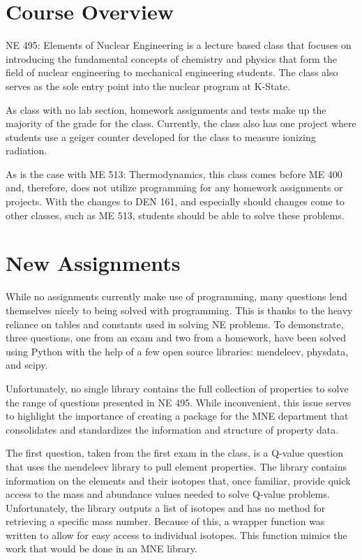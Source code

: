 \section{Course Overview}

NE 495: Elements of Nuclear Engineering is a lecture based class that focuses on introducing
the fundamental concepts of chemistry and physics that form the field of nuclear engineering 
to mechanical engineering students. The class also serves as the sole entry point into the nuclear
program at K-State. 

As class with no lab section, homework assignments and tests make up the majority of the grade
for the class. Currently, the class also has one project where students use a geiger counter 
developed for the class to measure ionizing radiation. 

As is the case with ME 513: Thermodynamics, this class comes before ME 400 and, therefore, does
not utilize programming for any homework assignments or projects. With the changes to DEN 161,
and especially should changes come to other classes, such as ME 513, students should be able 
to solve these problems.

\section{New Assignments}

While no assignments currently make use of programming, many questions lend themselves nicely
to being solved with programming. This is thanks to the heavy reliance on tables and
constants used in solving NE problems. To demonstrate, three questions, one from an exam
and two from a homework, have been solved using Python with the help of a few open source
libraries: mendeleev, physdata, and scipy.

Unfortunately, no single library contains the full collection of properties to solve the range
of questions presented in NE 495. While inconvenient, this issue serves to highlight the 
importance of creating a package for the MNE department that consolidates and standardizes the
information and structure of property data. 

The first question, taken from the first exam in the class, is a Q-value question that uses 
the mendeleev library to pull element properties. The library contains information on the elements
and their isotopes that, once familiar, provide quick access to the mass and abundance values
needed to solve Q-value problems. Unfortunately, the library outputs a list of isotopes and 
has no method for retrieving a specific mass number. Because of this, a wrapper function was
written to allow for easy access to individual isotopes. This function mimics the work that
would be done in an MNE library.

